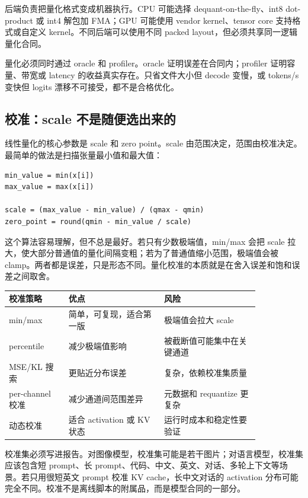  后端负责把量化格式变成机器执行。CPU 可能选择 dequant-on-the-fly、int8 dot-product 或 int4 解包加 FMA；GPU 可能使用 vendor kernel、tensor core 支持格式或自定义 kernel。不同后端可以使用不同 packed layout，但必须共享同一逻辑量化合同。

 量化必须同时通过 oracle 和 profiler。oracle 证明误差在合同内；profiler 证明容量、带宽或 latency 的收益真实存在。只省文件大小但 decode 变慢，或 tokens/s 变快但 logits 漂移不可接受，都不是合格优化。

\subsection{校准：scale 不是随便选出来的}

线性量化的核心参数是 scale 和 zero point。scale 由范围决定，范围由校准决定。最简单的做法是扫描张量最小值和最大值：

\begin{lstlisting}[numbers=none,caption={最小最大校准的基本形状}]
min_value = min(x[i])
max_value = max(x[i])

scale = (max_value - min_value) / (qmax - qmin)
zero_point = round(qmin - min_value / scale)
\end{lstlisting}

这个算法容易理解，但不总是最好。若只有少数极端值，min/max 会把 scale 拉大，使大部分普通值的量化间隔变粗；若为了普通值缩小范围，极端值会被 clamp。两者都是误差，只是形态不同。量化校准的本质就是在舍入误差和饱和误差之间取舍。

\begin{center}
\begin{tabular}{p{0.20\linewidth}p{0.32\linewidth}p{0.32\linewidth}}
\toprule
校准策略 & 优点 & 风险 \\
\midrule
min/max & 简单，可复现，适合第一版 & 极端值会拉大 scale \\
percentile & 减少极端值影响 & 被截断值可能集中在关键通道 \\
MSE/KL 搜索 & 更贴近分布误差 & 复杂，依赖校准集质量 \\
per-channel 校准 & 减少通道间范围差异 & 元数据和 requantize 更复杂 \\
动态校准 & 适合 activation 或 KV 状态 & 运行时成本和稳定性要验证 \\
\bottomrule
\end{tabular}
\end{center}

校准集必须写进报告。对图像模型，校准集可能是若干图片；对语言模型，校准集应该包含短 prompt、长 prompt、代码、中文、英文、对话、多轮上下文等场景。若只用很短英文 prompt 校准 KV cache，长中文对话的 activation 分布可能完全不同。校准不是离线脚本的附属品，而是模型合同的一部分。

